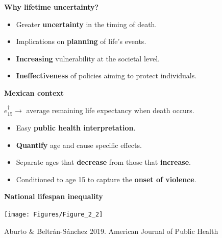 \documentclass[xcolor={dvipsnames}]{beamer}
\begin{document}
\begin{frame}
\LARGE{
\textbf{Why lifetime uncertainty?}
		\begin{itemize}
		
		\item Greater \textbf{uncertainty} in the timing of death. \pause

		\item Implications on \textbf{planning} of life's events. \pause
		
		\item \textbf{Increasing} vulnerability at the societal level. \pause
		
		\item \textbf{Ineffectiveness} of policies aiming to protect individuals.
						
		\end{itemize}

}
\end{frame}


\begin{frame}
\begin{center}
\LARGE{\textbf{Mexican context}}
\end{center}

\Large{
	\textbf{$e^{\dagger}_{15}\longrightarrow  $} average remaining life expectancy when death occurs.

	\begin{itemize}
		\item Easy \textbf{public health interpretation}.
		\pause
		\item \textbf{Quantify} age and cause specific effects.
		\pause
		\item Separate ages that \textbf{decrease} from those that \textbf{increase}.
		\pause
		\item Conditioned to age 15 to capture the \textbf{onset of violence}.
	\end{itemize}

}
\end{frame}



\begin{frame}
	\begin{center}
		\Large{\textbf{National lifespan inequality}}
	\end{center}

	\hspace*{-1cm}   
	\texttt{[image: Figures/Figure\_2\_2]}
	
	\tiny{Aburto \& Beltr\'an-S\'anchez 2019. American Journal of Public Health}
\end{frame}
\end{document}
